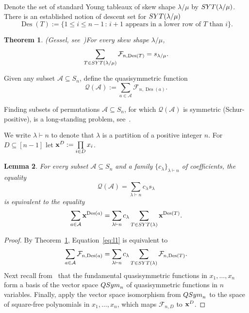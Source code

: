 \documentclass[10pt]{article}
\newtheorem{theorem}{Theorem}[section]
\newtheorem{lemma}[theorem]{Lemma}
\theoremstyle{definition}
\newcommand{\Q}{\mathcal Q}
\newcommand{\f}{\mathcal F}
\newcommand{\A}{\mathcal A}
\DeclareMathOperator\Des{Des}
\def\SYT{{\rm SYT}}
\begin{document}
Denote the set of standard Young tableaux of skew shape $\lambda/\mu$ by $\SYT(\lambda/\mu)$.
There is an established notion of descent set for $\SYT(\lambda/\mu)$
\begin{equation}\label{def:Des_SYT}
    \Des(T) := 
    \{1 \le i \le n-1 \,:\, i+1 \text{ appears in a lower row of }T\text{ than }i\}.
\end{equation}

\begin{theorem}{\rm (Gessel, see~\cite[Theorem 7.19.7]{EC2})}\label{G1} 
    For every skew shape $\lambda/\mu$,
    \[
        \sum\limits_{T\in \SYT(\lambda/\mu)}\f_{n,\Des(T)}=s_{\lambda/\mu}.
    \]
\end{theorem}	
		
Given any subset $\A\subseteq S_n$, define the quasisymmetric function
\[
    \Q(\A) := \sum_{a \in \A} \f_{n,\Des(a)}.
\]

Finding subsets of permutations $\A\subseteq S_n$, for which $\Q(\A)$ is symmetric (Schur-positive), is a  long-standing problem, see~\cite{GR}. 

We write $\lambda\vdash n$ to denote that $\lambda$ is a partition of a positive integer $n$.  
For $D\subseteq [n-1]$ let ${\bf x}^D:=\prod\limits_{i\in D}x_i$.

\begin{lemma}\label{lem:Schur-gf}
    For every subset $\A\subseteq S_n$ and a family $\{c_\lambda\}_{\lambda \vdash n}$
    of coefficients, the equality
    \begin{equation}\label{eq:l1}
        \Q(\A) =\sum_{\lambda\vdash n} c_{\lambda} s_{\lambda}
    \end{equation}
    is equivalent to the equality
    \begin{equation}\label{eq:l2}
        \sum\limits_{a\in \A} {\bf x}^{\Des(a)} = \sum_{\lambda\vdash n} c_{\lambda} 
        \sum_{T\in \SYT(\lambda)}{\bf x}^{\Des(T)}.
    \end{equation}
\end{lemma}

\begin{proof}
    By Theorem~\ref{G1}, 
    Equation~\eqref{eq:l1} is equivalent to
    \[
        \sum\limits_{a\in \A} \f_{n,\Des(a)}= \sum\limits_{\lambda\vdash n} c_{\lambda} \sum\limits_{T\in \SYT(\lambda)}\f_{n,\Des(T)}.
    \]
    Next recall from~\cite[Ch.~7]{EC2} that the fundamental quasisymmetric functions in $x_1,\dots,x_n$
    form a basis of the vector space ${\rm{QSym}}_n$ of quasisymmetric functions in $n$ variables.
    Finally, apply the vector space isomorphism from ${\rm{QSym}}_n$ 
    to the space of 
    square-free polynomials in $x_1,\ldots,x_n$, which maps 
    $\f_{n,D}$ to ${\bf x}^D$. 
\end{proof}
\end{document}
